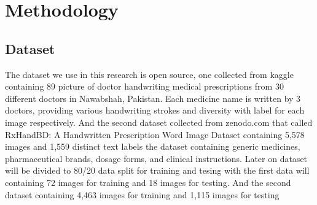 \section{Methodology}\label{sec:methodology}
\subsection{Dataset}
The dataset we use in this research is open source, one collected from kaggle containing 89 picture of doctor handwriting medical prescriptions from 30 different doctors in Nawabshah, Pakistan. 
Each medicine name is written by 3 doctors, providing various handwriting strokes and diversity with label for each image respectively. 
And the second dataset collected from zenodo.com that called RxHandBD: A Handwritten Prescription Word Image Dataset containing  5,578 images and 1,559 distinct text labels the dataset containing generic medicines, pharmaceutical brands, dosage forms, and clinical instructions. 
Later on dataset will be divided to 80/20 data split for training and tesing with the first data will containing 72 images for training and 18 images for testing. And the second dataset containing 4,463 images for training and 1,115 images for testing
